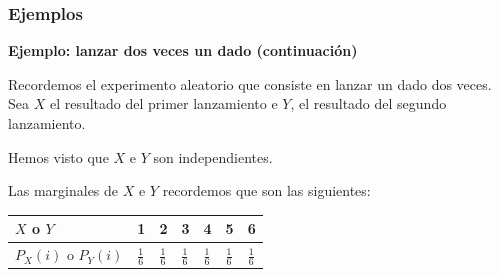 \documentclass[]{book}
\begin{document}
\hypertarget{ejemplos-4}{%
\subsubsection{Ejemplos}\label{ejemplos-4}}

\textbf{Ejemplo: lanzar dos veces un dado (continuación)}

Recordemos el experimento aleatorio que consiste en lanzar un dado dos veces. Sea \(X\) el resultado del primer lanzamiento e \(Y\), el resultado del segundo lanzamiento.

Hemos visto que \(X\) e \(Y\) son independientes.

Las marginales de \(X\) e \(Y\) recordemos que son las siguientes:

\begin{longtable}[]{@{}lllllll@{}}
\toprule
\begin{minipage}[b]{0.15\columnwidth}\raggedright
\(X\) o \(Y\)\strut
\end{minipage} & \begin{minipage}[b]{0.11\columnwidth}\raggedright
1\strut
\end{minipage} & \begin{minipage}[b]{0.11\columnwidth}\raggedright
2\strut
\end{minipage} & \begin{minipage}[b]{0.11\columnwidth}\raggedright
3\strut
\end{minipage} & \begin{minipage}[b]{0.11\columnwidth}\raggedright
4\strut
\end{minipage} & \begin{minipage}[b]{0.11\columnwidth}\raggedright
5\strut
\end{minipage} & \begin{minipage}[b]{0.11\columnwidth}\raggedright
6\strut
\end{minipage}\tabularnewline
\midrule
\endhead
\begin{minipage}[t]{0.15\columnwidth}\raggedright
\(P_X(i)\) o \(P_Y(i)\)\strut
\end{minipage} & \begin{minipage}[t]{0.11\columnwidth}\raggedright
\(\frac{1}{6}\)\strut
\end{minipage} & \begin{minipage}[t]{0.11\columnwidth}\raggedright
\(\frac{1}{6}\)\strut
\end{minipage} & \begin{minipage}[t]{0.11\columnwidth}\raggedright
\(\frac{1}{6}\)\strut
\end{minipage} & \begin{minipage}[t]{0.11\columnwidth}\raggedright
\(\frac{1}{6}\)\strut
\end{minipage} & \begin{minipage}[t]{0.11\columnwidth}\raggedright
\(\frac{1}{6}\)\strut
\end{minipage} & \begin{minipage}[t]{0.11\columnwidth}\raggedright
\(\frac{1}{6}\)\strut
\end{minipage}\tabularnewline
\bottomrule
\end{longtable}
\end{document}
